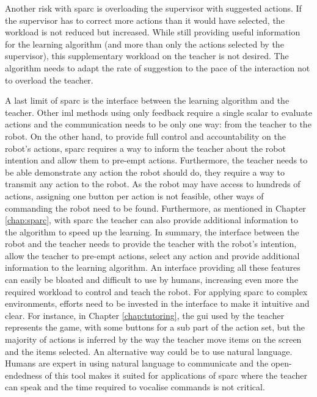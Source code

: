 Another risk with \gls{sparc} is overloading the supervisor with suggested actions. If the supervisor has to correct more actions than it would have selected, the workload is not reduced but increased. While still providing useful information for the learning algorithm (and more than only the actions selected by the supervisor), this supplementary workload on the teacher is not desired. The algorithm needs to adapt the rate of suggestion to the pace of the interaction not to overload the teacher.

A last limit of \gls{sparc} is the interface between the learning algorithm and the teacher. Other \gls{iml} methods using only feedback require a single scalar to evaluate actions and the communication needs to be only one way: from the teacher to the robot. On the other hand, to provide full control and accountability on the robot's actions, \gls{sparc} requires a way to inform the teacher about the robot intention and allow them to pre-empt actions. Furthermore, the teacher needs to be able demonstrate any action the robot should do, they require a way to transmit any action to the robot. As the robot may have access to hundreds of actions, assigning one button per action is not feasible, other ways of commanding the robot need to be found. Furthermore, as mentioned in Chapter \ref{chap:sparc}, with \gls{sparc} the teacher can also provide additional information to the algorithm to speed up the learning. In summary, the interface between the robot and the teacher needs to provide the teacher with the robot's intention, allow the teacher to pre-empt actions, select any action and provide additional information to the learning algorithm. An interface providing all these features can easily be bloated and difficult to use by humans, increasing even more the required workload to control and teach the robot. For applying \gls{sparc} to complex environments, efforts need to be invested in the interface to make it intuitive and clear. For instance, in Chapter \ref{chap:tutoring}, the \gls{gui} used by the teacher represents the game, with some buttons for a sub part of the action set, but the majority of actions is inferred by the way the teacher move items on the screen and the items selected. An alternative way could be to use natural language. Humans are expert in using natural language to communicate and the open-endedness of this tool makes it suited for applications of \gls{sparc} where the teacher can speak and the time required to vocalise commands is not critical.


